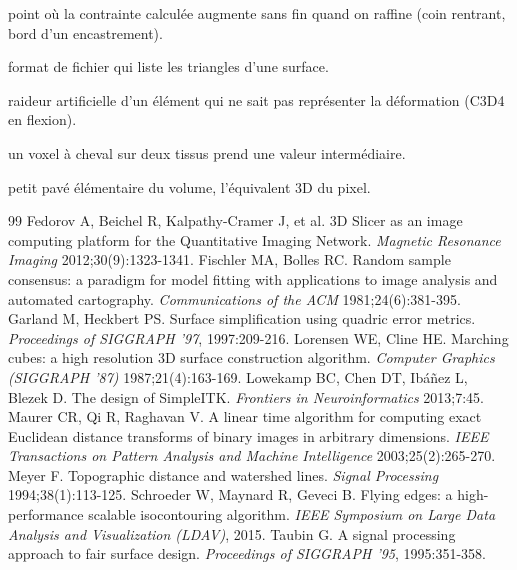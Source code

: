 \documentclass[11pt,a4paper]{article}
\begin{document}
\begin{description}[style=nextline, leftmargin=1.2cm, itemsep=1pt]
  \item[Singularité] point où la contrainte calculée augmente sans fin quand on raffine (coin rentrant, bord d'un
  encastrement).
  \item[STL] format de fichier qui liste les triangles d'une surface.
  \item[Verrouillage] raideur artificielle d'un élément qui ne sait pas représenter la déformation (C3D4 en flexion).
  \item[Volume partiel] un voxel à cheval sur deux tissus prend une valeur intermédiaire.
  \item[Voxel] petit pavé élémentaire du volume, l'équivalent 3D du pixel.
\end{description}

\begin{thebibliography}{99}
 Fedorov A, Beichel R, Kalpathy-Cramer J, et al. 3D Slicer as an image computing platform for
the Quantitative Imaging Network. \emph{Magnetic Resonance Imaging} 2012;30(9):1323-1341.
 Fischler MA, Bolles RC. Random sample consensus: a paradigm for model fitting with applications
to image analysis and automated cartography. \emph{Communications of the ACM} 1981;24(6):381-395.
 Garland M, Heckbert PS. Surface simplification using quadric error metrics. \emph{Proceedings
of SIGGRAPH '97}, 1997:209-216.
 Lorensen WE, Cline HE. Marching cubes: a high resolution 3D surface construction algorithm.
\emph{Computer Graphics (SIGGRAPH '87)} 1987;21(4):163-169.
 Lowekamp BC, Chen DT, Ibáñez L, Blezek D. The design of SimpleITK. \emph{Frontiers in
Neuroinformatics} 2013;7:45.
 Maurer CR, Qi R, Raghavan V. A linear time algorithm for computing exact Euclidean distance
transforms of binary images in arbitrary dimensions. \emph{IEEE Transactions on Pattern Analysis and Machine
Intelligence} 2003;25(2):265-270.
 Meyer F. Topographic distance and watershed lines. \emph{Signal Processing} 1994;38(1):113-125.
 Schroeder W, Maynard R, Geveci B. Flying edges: a high-performance scalable isocontouring
algorithm. \emph{IEEE Symposium on Large Data Analysis and Visualization (LDAV)}, 2015.
 Taubin G. A signal processing approach to fair surface design. \emph{Proceedings of SIGGRAPH
'95}, 1995:351-358.
\end{thebibliography}
\end{document}
